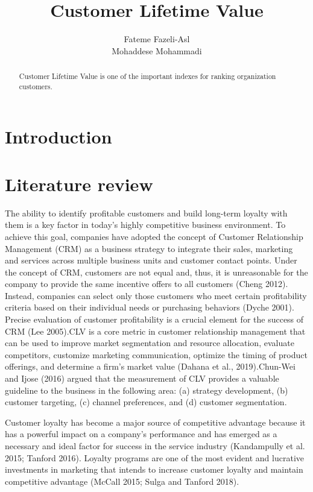 \documentclass{article}
\title{Customer Lifetime Value}
\author{Fateme Fazeli-Asl \\
Mohaddese Mohammadi}
\begin{document}
\maketitle


\begin{abstract}
Customer Lifetime Value is  one of the important indexes for ranking organization customers.
\end{abstract}

\section{Introduction}\label{sec.Intro}

\section{Literature review}\label{sec.review}
\par The ability to identify profitable customers and build long-term loyalty with them is a key factor in today’s highly competitive business environment. To achieve this goal, companies have adopted the concept of Customer Relationship Management (CRM) as a business strategy to integrate their sales, marketing and services across multiple business units and customer contact points. Under the concept of CRM, customers are not equal and, thus, it is unreasonable for the company to provide the same incentive offers to all customers (Cheng 2012). Instead, companies can select only those customers who meet certain profitability criteria based on their individual needs or purchasing behaviors (Dyche 2001). Precise evaluation of customer profitability is a crucial element for the success of CRM (Lee 2005).CLV is a core metric in customer relationship management that can be used to improve market segmentation and resource allocation, evaluate competitors, customize marketing communication, optimize the timing of product offerings, and determine a firm’s market value (Dahana et al., 2019).Chun-Wei and Ijose (2016) argued that the measurement of CLV provides a valuable guideline to the business in the following area: (a) strategy development, (b) customer targeting, (c) channel preferences, and (d) customer segmentation.
\par Customer loyalty has become a major source of competitive advantage because it has a powerful impact on a company’s performance and has emerged as a necessary and ideal factor for success in the service industry (Kandampully et al. 2015; Tanford 2016). Loyalty programs are one of the most evident and lucrative investments in marketing that intends to increase customer loyalty and maintain competitive advantage (McCall 2015; Sulga and Tanford 2018).
\par
\end{document}
